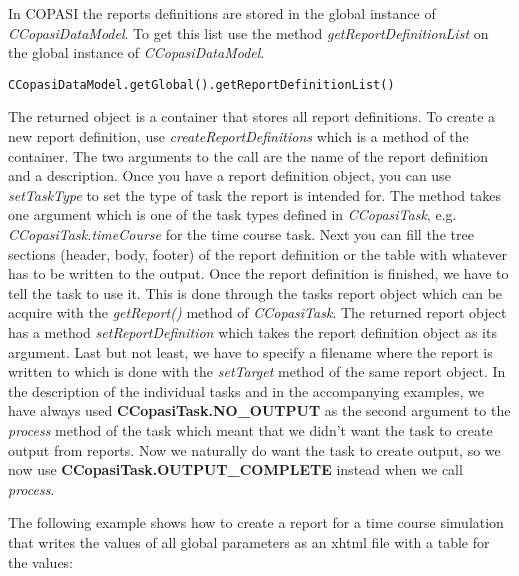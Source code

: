 \documentclass[a4,10pt]{article}
\begin{document}
In COPASI the reports definitions are stored in the global instance of \textit{CCopasiDataModel}. To get this list use the method \textit{getReportDefinitionList} on the global instance of \textit{CCopasiDataModel}.

\begin{verbatim}
CCopasiDataModel.getGlobal().getReportDefinitionList()
\end{verbatim}

The returned object is a container that stores all report definitions. To create a new report definition, use \textit{createReportDefinitions} which is a method of the container. The two arguments to the call are the name of the report definition and a description. Once you have a report definition object, you can use \textit{setTaskType} to set the type of task the report is intended for. The method takes one argument which is one of the task types defined in \textit{CCopasiTask}, e.g. \textit{CCopasiTask.timeCourse} for the time course task.
Next you can fill the tree sections (header, body, footer) of the report definition or the table  with whatever has to be written to the output.
Once the report definition is finished, we have to tell the task to use it. This is done through the tasks report object which can be acquire with the \textit{getReport()} method of \textit{CCopasiTask}. The returned report object has a method \textit{setReportDefinition} which takes the report definition object as its argument.
Last but not least, we have to specify a filename where the report is written to which is done with the \textit{setTarget} method of the same report object.
In the description of the individual tasks and in the accompanying examples, we have always used \textbf{CCopasiTask.NO\_OUTPUT} as the second argument to the \textit{process} method of the task which meant that we didn't want the task to create output from reports. Now we naturally do want the task to create output, so we now use \textbf{CCopasiTask.OUTPUT\_COMPLETE} instead when we call \textit{process}.

The following example shows how to create a report for a time course simulation that writes the values of all global parameters as an xhtml file with a table for the values:
\end{document}
